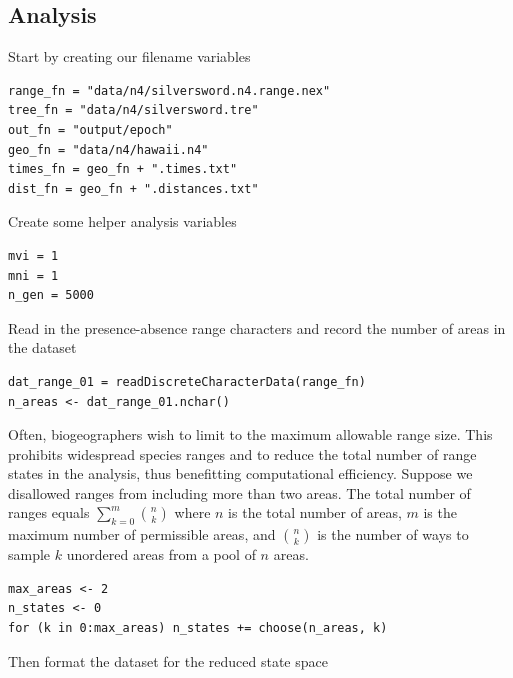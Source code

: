 \subsection*{Analysis}

Start by creating our filename variables

\begin{snugshade}
\begin{lstlisting}
range_fn = "data/n4/silversword.n4.range.nex"
tree_fn = "data/n4/silversword.tre"
out_fn = "output/epoch"
geo_fn = "data/n4/hawaii.n4"
times_fn = geo_fn + ".times.txt"
dist_fn = geo_fn + ".distances.txt"
\end{lstlisting}
\end{snugshade}

Create some helper analysis variables

\begin{snugshade}
\begin{lstlisting}
mvi = 1
mni = 1
n_gen = 5000
\end{lstlisting}
\end{snugshade}


Read in the presence-absence range characters and record the number of areas in the dataset

\begin{snugshade}
\begin{lstlisting}
dat_range_01 = readDiscreteCharacterData(range_fn)
n_areas <- dat_range_01.nchar()
\end{lstlisting}
\end{snugshade}

Often, biogeographers wish to limit to the maximum allowable range size.
This prohibits widespread species ranges and to reduce the total number of range states in the analysis, thus benefitting computational efficiency.
Suppose we disallowed ranges from including more than two areas.
The total number of ranges equals $\sum_{k=0}^m {{n}\choose{k}}$ where $n$ is the total number of areas, $m$ is the maximum number of permissible areas, and ${{n}\choose{k}}$ is the number of ways to sample $k$ unordered areas from a pool of $n$ areas.

\begin{snugshade}
\begin{lstlisting}
max_areas <- 2
n_states <- 0
for (k in 0:max_areas) n_states += choose(n_areas, k)
\end{lstlisting}
\end{snugshade}

Then format the dataset for the reduced state space


